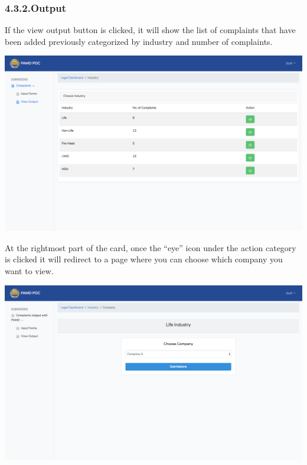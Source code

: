 \documentclass{article}
\begin{document}
\subsubsection{4.3.2.\hspace*{0.5em}Output}\label{sec-output}%

\noindent{}If the view output button is clicked, it will show the
list of complaints that have been added previously categorized by
industry and number of complaints.%

\includegraphics[keepaspectratio=true]{up-ic-screens/image103}{}%

At the rightmost part of the card, once the “eye” icon
under the action category is clicked it will redirect to a page where
you can choose which company you want to view.%

\includegraphics[keepaspectratio=true]{up-ic-screens/image157}{}%
\end{document}
